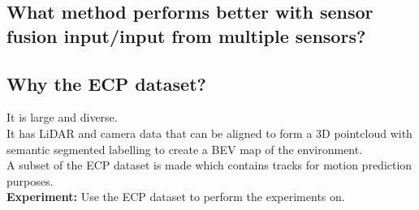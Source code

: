 \subsection{What method performs better with sensor fusion input/input from multiple sensors?}

\subsection{Why the ECP dataset?}
It is large and diverse. \\

It has LiDAR and camera data that can be aligned to form a 3D pointcloud with semantic segmented labelling to create a BEV map of the environment. \\

A subset of the ECP dataset is made which contains tracks for motion prediction purposes. \\

\textbf{Experiment:} Use the ECP dataset to perform the experiments on.


